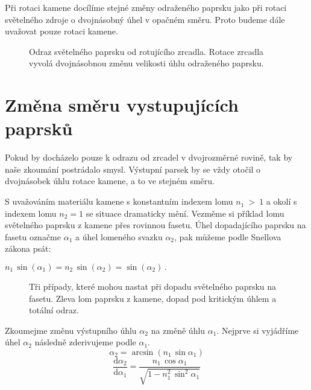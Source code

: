 Při rotaci kamene docílíme stejné změny odraženého paprsku jako při rotaci světelného zdroje o dvojnásobný úhel v opačném směru. Proto budeme dále uvažovat pouze rotaci kamene. 


\begin{figure}[h!]
\begin{center}
\scalebox{1}{ }
\end{center}
\caption[Odraz světelného paprsku od rotujícího zrcadla.]{Odraz světelného paprsku od rotujícího zrcadla. Rotace zrcadla vyvolá dvojnásobnou změnu velikosti úhlu odraženého paprsku.}
\label{fig:odraz zrcadlo}
\end{figure}

\section{Změna směru vystupujících paprsků}
\label{sec: zmena smeru}
Pokud by docházelo pouze k odrazu od zrcadel v dvojrozměrné rovině, tak by naše zkoumání postrádalo smysl. Výstupní parsek by se vždy otočil o dvojnásobek úhlu rotace kamene, a to ve stejném směru. 

S uvažováním materiálu kamene s konstantním indexem lomu $ n_1~>~1 $ a okolí s indexem lomu $ n_2 = 1 $ se situace dramaticky mění. Vezměme si příklad lomu světelného paprsku z kamene přes rovinnou fasetu. Úhel dopadajícího paprsku na fasetu označme $\alpha_1$ a úhel lomeného svazku $\alpha_2$, pak můžeme podle Snellova zákona psát:

\begin{center}
$n_1\,\sin(\alpha_1) = n_2\,\sin(\alpha_2) = \sin(\alpha_2)\,.$
\end{center}

\begin{figure}[h!]
\begin{center}
\scalebox{.9}{ }
\end{center}
\caption[Kritický úhel a totální odraz.]{Tři případy, které mohou nastat při dopadu světelného paprsku na fasetu. Zleva lom paprsku z kamene, dopad pod kritickým úhlem a totální odraz.}
\label{fig:lom ven }
\end{figure}

Zkoumejme změnu výstupního úhlu $\alpha_2$ na změně úhlu $\alpha_1$. Nejprve si vyjádříme úhel $\alpha_2$ následně zderivujeme podle $\alpha_1$. 
\begin{equation}
\alpha_2 = \arcsin(n_1\,\sin\alpha_1)
\label{eq:derivace uhlu1}  
\end{equation}
\begin{equation} \frac{\mathrm{d}\alpha_2}{\mathrm{d}\alpha_1}= \frac{n_1\,\cos\alpha_1}{\sqrt{1-n_1^2\,\sin^2\alpha_1}}
\label{eq:derivace uhlu}  
\end{equation}

